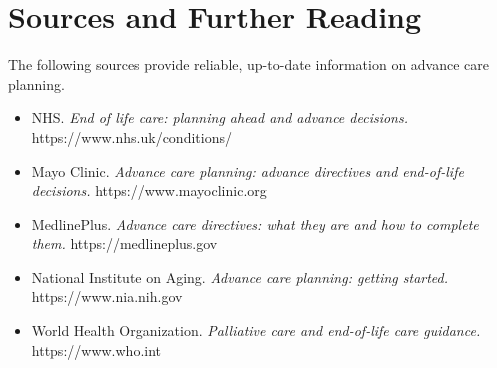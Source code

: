 \section*{Sources and Further Reading}
The following sources provide reliable, up-to-date information on advance care planning.

\begin{itemize}
    \item NHS. \textit{End of life care: planning ahead and advance decisions.} https://www.nhs.uk/conditions/
    \item Mayo Clinic. \textit{Advance care planning: advance directives and end-of-life decisions.} https://www.mayoclinic.org
    \item MedlinePlus. \textit{Advance care directives: what they are and how to complete them.} https://medlineplus.gov
    \item National Institute on Aging. \textit{Advance care planning: getting started.} https://www.nia.nih.gov
    \item World Health Organization. \textit{Palliative care and end-of-life care guidance.} https://www.who.int
\end{itemize}
